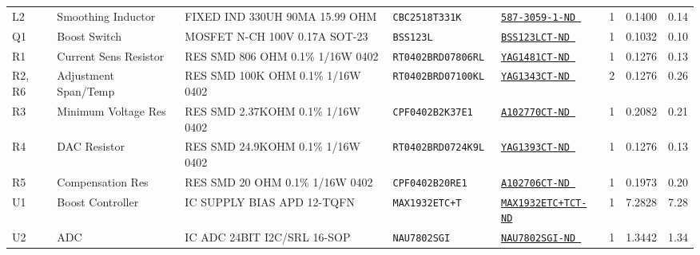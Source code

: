 \begin{table}[h]
\begin{adjustbox}{width=\textwidth,center}
\begin{tabular}{lllllrrr}
            L2               & Smoothing Inductor     & FIXED IND 330UH 90MA 15.99 OHM          & \texttt{CBC2518T331K      } & \href{http://search.digikey.com/scripts/DkSearch/dksus.dll?Detail&name=587-3059-1-ND    }{\texttt{587-3059-1-ND    }}      & 1     & 0.1400     & 0.14  \\
            Q1               & Boost Switch           & MOSFET N-CH 100V 0.17A SOT-23           & \texttt{BSS123L           } & \href{http://search.digikey.com/scripts/DkSearch/dksus.dll?Detail&name=BSS123LCT-ND     }{\texttt{BSS123LCT-ND     }}      & 1     & 0.1032     & 0.10  \\
            R1               & Current Sens Resistor  & RES SMD 806 OHM 0.1\% 1/16W 0402        & \texttt{RT0402BRD07806RL  } & \href{http://search.digikey.com/scripts/DkSearch/dksus.dll?Detail&name=YAG1481CT-ND     }{\texttt{YAG1481CT-ND     }}      & 1     & 0.1276     & 0.13  \\
            R2, R6           & Adjustment Span/Temp   & RES SMD 100K OHM 0.1\% 1/16W 0402       & \texttt{RT0402BRD07100KL  } & \href{http://search.digikey.com/scripts/DkSearch/dksus.dll?Detail&name=YAG1343CT-ND     }{\texttt{YAG1343CT-ND     }}      & 2     & 0.1276     & 0.26  \\
            R3               & Minimum Voltage Res    & RES SMD 2.37KOHM 0.1\% 1/16W 0402       & \texttt{CPF0402B2K37E1    } & \href{http://search.digikey.com/scripts/DkSearch/dksus.dll?Detail&name=A102770CT-ND     }{\texttt{A102770CT-ND     }}      & 1     & 0.2082     & 0.21  \\
            R4               & DAC Resistor           & RES SMD 24.9KOHM 0.1\% 1/16W 0402       & \texttt{RT0402BRD0724K9L  } & \href{http://search.digikey.com/scripts/DkSearch/dksus.dll?Detail&name=YAG1393CT-ND     }{\texttt{YAG1393CT-ND     }}      & 1     & 0.1276     & 0.13  \\
            R5               & Compensation Res       & RES SMD 20 OHM 0.1\% 1/16W 0402         & \texttt{CPF0402B20RE1     } & \href{http://search.digikey.com/scripts/DkSearch/dksus.dll?Detail&name=A102706CT-ND     }{\texttt{A102706CT-ND     }}      & 1     & 0.1973     & 0.20  \\
            U1               & Boost Controller       & IC SUPPLY BIAS APD 12-TQFN              & \texttt{MAX1932ETC+T      } & \href{http://search.digikey.com/scripts/DkSearch/dksus.dll?Detail&name=MAX1932ETC+TCT-ND}{\texttt{MAX1932ETC+TCT-ND}}      & 1     & 7.2828     & 7.28  \\
            U2               & ADC                    & IC ADC 24BIT I2C/SRL 16-SOP             & \texttt{NAU7802SGI        } & \href{http://search.digikey.com/scripts/DkSearch/dksus.dll?Detail&name=NAU7802SGI-ND    }{\texttt{NAU7802SGI-ND    }}      & 1     & 1.3442     & 1.34  \\

\end{tabular}
\end{adjustbox}
\end{table}
